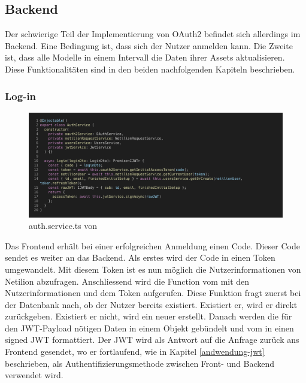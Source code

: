 \subsection{Backend}
Der schwierige Teil der Implementierung von OAuth2 befindet sich allerdings im Backend. Eine Bedingung ist, dass sich der Nutzer anmelden kann. Die Zweite ist, dass alle Modelle in einem Intervall die Daten ihrer Assets aktualisieren. Diese Funktionalitäten sind in den beiden nachfolgenden Kapiteln beschrieben.
\subsubsection{Log-in}
\begin{figure}[H]
  \centering
  \includegraphics[width=.95\linewidth]{./images/auth.service.ts.png}
  \caption[{auth.service.ts von }]{auth.service.ts von }
  \label{fig:auth-service}
\end{figure}
Das Frontend erhält bei einer erfolgreichen Anmeldung einen Code. Dieser Code sendet es weiter an das Backend. Als erstes wird der Code in einen Token umgewandelt. Mit diesem Token ist es nun möglich die Nutzerinformationen von Netilion abzufragen. Anschliessend wird die Function  vom  mit den Nutzerinformationen und dem Token aufgerufen. Diese Funktion fragt zuerst bei der Datenbank nach, ob der Nutzer bereits existiert. Existiert er, wird er direkt zurückgeben. Existiert er nicht, wird ein neuer erstellt.
Danach werden die für den JWT-Payload nötigen Daten in einem Objekt gebündelt und vom  in einen signed JWT formattiert.
\newline
Der JWT wird als Antwort auf die Anfrage zurück ans Frontend gesendet, wo er fortlaufend, wie in Kapitel \ref{andwendung-jwt} beschrieben, als Authentifizierungsmethode zwischen Front- und Backend verwendet wird.
